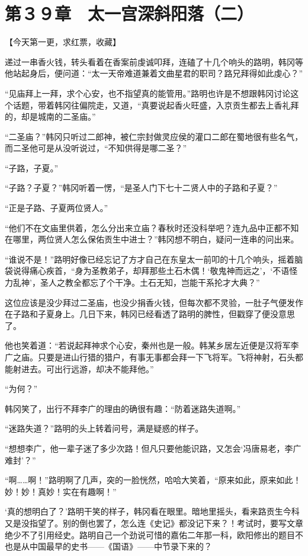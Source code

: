\section{第３９章　太一宫深斜阳落（二）}

【今天第一更，求红票，收藏】

递过一串香火钱，转头看着在香案前虔诚叩拜，连磕了十几个响头的路明，韩冈等他站起身后，便问道：“太一天帝难道兼着文曲星君的职司？路兄拜得如此虔心？”

“见庙拜上一拜，求个心安，也不指望真的能管用。”路明也许是不想跟韩冈讨论这个话题，带着韩冈往偏院走，又道，“真要说起香火旺盛，入京贡生都去上香礼拜的，却是城南的二圣庙。”

“二圣庙？”韩冈只听过二郎神，被仁宗封做灵应侯的灌口二郎在蜀地很有些名气，而二圣他可是从没听说过，“不知供得是哪二圣？”

“子路，子夏。”

“子路？子夏？”韩冈听着一愣，“是圣人门下七十二贤人中的子路和子夏？”

“正是子路、子夏两位贤人。”

“他们不在文庙里供着，怎么分出来立庙？春秋时还没科举吧？连九品中正都不知在哪里，两位贤人怎么保佑贡生中进士？”韩冈想不明白，疑问一连串的问出来。

“谁说不是！”路明好像已经忘记了方才自己在东皇太一前叩的十几个响头，摇着脑袋说得痛心疾首，“身为圣教弟子，却拜那些土石木偶！‘敬鬼神而远之’，‘不语怪力乱神’，圣人之教全都忘了个干净。土石无知，岂能干系抡才大典？”

这位应该是没少拜过二圣庙，也没少捐香火钱，但每次都不灵验，一肚子气便发作在子路和子夏身上。几日下来，韩冈已经看透了路明的脾性，但戳穿了便没意思了。

他也笑着道：“若说起拜神求个心安，秦州也是一般。韩某乡居左近便是汉将军李广之庙。只要是进山行猎的猎户，有事无事都会拜一下飞将军。飞将神射，石头都能射进去。可出行远游，却决不能拜他。”

“为何？”

韩冈笑了，出行不拜李广的理由的确很有趣：“防着迷路失道啊。”

“迷路失道？”路明的头上转着问号，满是疑惑的样子。

“想想李广，他一辈子迷了多少次路！但凡只要他能识路，又怎会‘冯唐易老，李广难封’？”

“啊……啊！”路明啊了几声，突的一脸恍然，哈哈大笑着，“原来如此，原来如此！妙！妙！真妙！实在有趣啊！”

‘真的想明白了？’路明干笑的样子，韩冈看在眼里。暗地里摇头，看来路贡生今科又是没指望了。别的倒也罢了，怎么连《史记》都没记下来？！考试时，要写文章绝少不了引用经史。路明自己一个劲说可惜的嘉佑二年那一科，欧阳修出的题目不也是从中国最早的史书——《国语》——中节录下来的？


